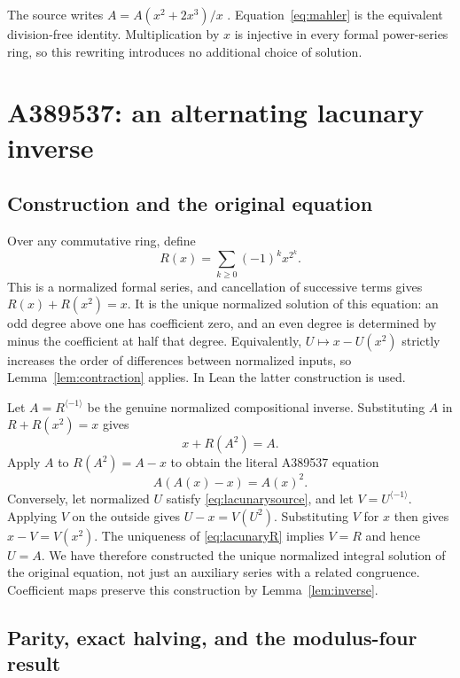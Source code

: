 \documentclass[11pt,a4paper]{article}
\theoremstyle{remark}
\newcommand{\rev}{^{\langle-1\rangle}}
\begin{document}
The source writes $A=A(x^2+2x^3)/x$ \cite{oeis536}.
Equation~\eqref{eq:mahler} is the equivalent division-free identity.
Multiplication by $x$ is injective in every formal power-series ring,
so this rewriting introduces no additional choice of solution.

\section{A389537: an alternating lacunary inverse}

\subsection{Construction and the original equation}

Over any commutative ring, define
\begin{equation}\label{eq:lacunaryR}
 R(x)=\sum_{k\ge0}(-1)^kx^{2^k}.
\end{equation}
This is a normalized formal series, and cancellation of successive terms
gives $R(x)+R(x^2)=x$. It is the unique normalized solution of this
equation: an odd degree above one has coefficient zero, and an even
degree is determined by minus the coefficient at half that degree.
Equivalently, $U\mapsto x-U(x^2)$ strictly increases the order of
differences between normalized inputs, so Lemma~\ref{lem:contraction}
applies. In Lean the latter construction is used.

Let $A=R\rev$ be the genuine normalized compositional inverse.
Substituting $A$ in $R+R(x^2)=x$ gives
\[
 x+R(A^2)=A.
\]
Apply $A$ to $R(A^2)=A-x$ to obtain the literal A389537 equation
\begin{equation}\label{eq:lacunarysource}
 A(A(x)-x)=A(x)^2.
\end{equation}
Conversely, let normalized $U$ satisfy \eqref{eq:lacunarysource},
and let $V=U\rev$. Applying $V$ on the outside gives
$U-x=V(U^2)$. Substituting $V$ for $x$ then gives
$x-V=V(x^2)$. The uniqueness of \eqref{eq:lacunaryR} implies $V=R$
and hence $U=A$. We have therefore constructed the unique normalized
integral solution of the original equation, not just an auxiliary
series with a related congruence. Coefficient maps preserve this
construction by Lemma~\ref{lem:inverse}.

\subsection{Parity, exact halving, and the modulus-four result}
\end{document}
